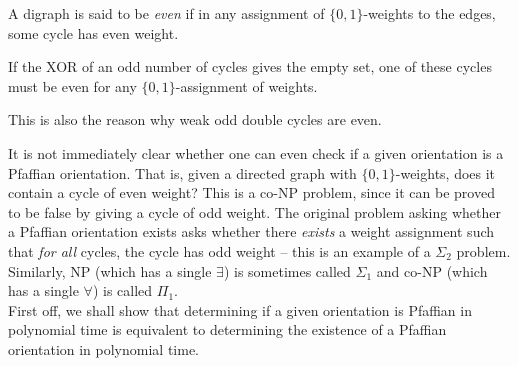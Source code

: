 


\begin{fdef}
	A digraph is said to be \emph{even} if in any assignment of $\{0,1\}$-weights to the edges, some cycle has even weight.
\end{fdef}

\begin{fprop}
	\label{prop:1}
	If the XOR of an odd number of cycles gives the empty set, one of these cycles must be even for any $\{0,1\}$-assignment of weights.
\end{fprop}
This is also the reason why weak odd double cycles are even.

It is not immediately clear whether one can even check if a given orientation is a Pfaffian orientation. That is, given a directed graph with $\{0,1\}$-weights, does it contain a cycle of even weight? This is a co-\textsf{NP} problem, since it can be proved to be false by giving a cycle of odd weight. The original problem asking whether a Pfaffian orientation exists asks whether there \emph{exists} a weight assignment such that \emph{for all} cycles, the cycle has odd weight -- this is an example of a $\Sigma_2$ problem. Similarly, \textsf{NP} (which has a single $\exists$) is sometimes called $\Sigma_1$ and co-\textsf{NP} (which has a single $\forall$) is called $\Pi_1$.\\

First off, we shall show that determining if a given orientation is Pfaffian in polynomial time is equivalent to determining the existence of a Pfaffian orientation in polynomial time. 



